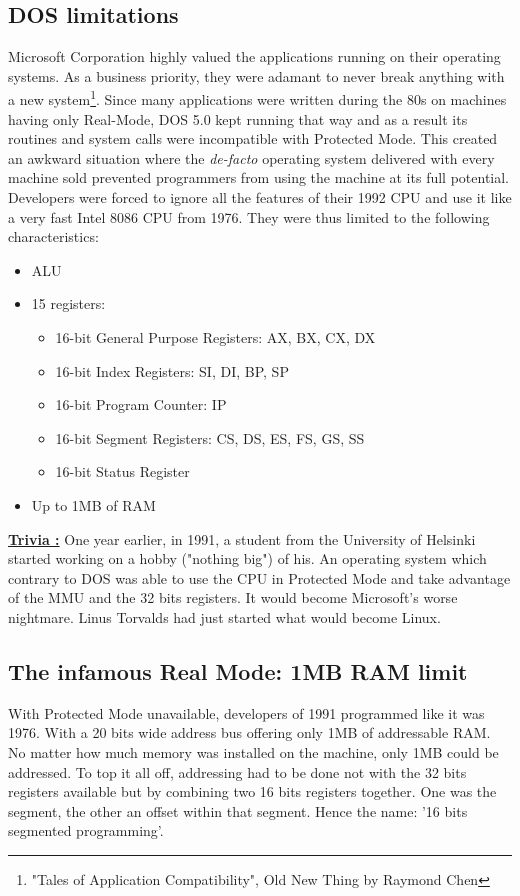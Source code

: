 \documentclass[book.tex]{subfiles}
\begin{document}
  \subsection{DOS limitations}
  Microsoft Corporation highly valued the applications running on their operating systems. As a business priority, they were adamant to never break anything with a new system\footnote{"Tales of Application Compatibility", Old New Thing by Raymond Chen}.  Since many applications were written during the 80s on machines having only Real-Mode, DOS 5.0 kept running that way and as a result its routines and system calls were incompatible with Protected Mode. This created an awkward situation where the \emph{de-facto} operating system delivered with every machine sold prevented programmers from using the machine at its full potential. Developers were forced to ignore all the features of their 1992 CPU and use it like a very fast Intel 8086 CPU from 1976. They were thus limited to the following characteristics: \\
\begin{itemize}
\item ALU
\item 15 registers:
\begin{itemize}
  \item 16-bit General Purpose Registers: AX, BX, CX, DX
  \item 16-bit Index Registers: SI, DI, BP, SP
  \item 16-bit Program Counter: IP
  \item 16-bit Segment Registers: CS, DS, ES, FS, GS, SS
  \item 16-bit Status Register
\end{itemize}
\item Up to 1MB of RAM
\end{itemize}


\bigskip

 \textbf{\underline{Trivia :}} One year earlier, in 1991, a student from the University of Helsinki started working on a hobby ("nothing big") of his. An operating system which contrary to DOS was able to use the CPU in Protected Mode and take advantage of the MMU and the 32 bits registers. It would become Microsoft's worse nightmare. Linus Torvalds had just started what would become Linux.



  \subsection{The infamous Real Mode: 1MB RAM limit}
  With Protected Mode unavailable, developers of 1991 programmed like it was 1976. With a 20 bits wide address bus offering only 1MB of addressable RAM. No matter how much memory was installed on the machine, only 1MB could be addressed. To top it all off, addressing had to be done not with the 32 bits registers available but by combining two 16 bits registers together. One was the segment, the other an offset within that segment. Hence the name: '16 bits segmented programming'.
\end{document}
